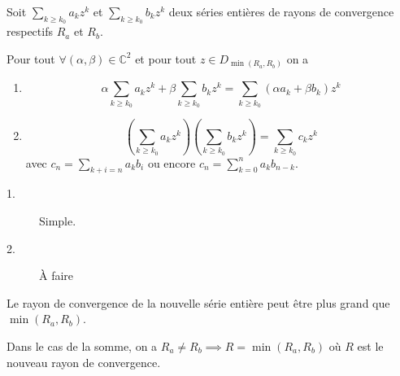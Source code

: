 \documentclass[a4paper, 12pt]{article}
\begin{document}
\begin{proposition}{}{}
    Soit $\sum\limits_{k \geq k_0} a_k z^k$ et $\sum\limits_{k \geq k_0} b_k z^k$ deux séries entières de rayons de convergence respectifs $R_a$ et $R_b$.

    Pour tout $\forall (\alpha, \beta) \in \mathbb{C}^2$ et pour tout $z \in D_{\min(R_a, R_b)}$ on a
    \begin{enumerate}
        \item 
        $$
        \alpha \sum_{k \geq k_0} a_k z^k + \beta \sum_{k \geq k_0} b_k z^k = \sum_{k \geq k_0} (\alpha a_k + \beta b_k) z^k
        $$

        \item
        $$
        \left(\sum_{k \geq k_0} a_k z^k\right) \left(\sum_{k \geq k_0} b_k z^k\right) = \sum_{k \geq k_0} c_k z^k
        $$
        avec $c_n = \sum_{k + i = n} a_k b_i$ ou encore $c_n = \sum_{k = 0}^n a_k b_{n - k}$.
    \end{enumerate}
\end{proposition}

\begin{demonstration}
    \begin{description}
        \item[1.]
        Simple.

        \item[2.]
        \begin{hotwarn}
            À faire
        \end{hotwarn}
    \end{description}
\end{demonstration}

\begin{remarque}
    Le rayon de convergence de la nouvelle série entière peut être plus grand que $\min(R_a, R_b)$.

    Dans le cas de la somme, on a $R_a \neq R_b \implies R = \min(R_a, R_b)$ où $R$ est le nouveau rayon de convergence.
\end{remarque}
\end{document}
